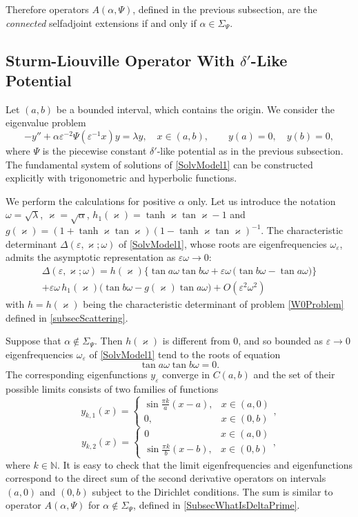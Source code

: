 \documentclass[11pt,english]{amsart}%
\DeclareMathOperator*{\tnh}{tanh} \DeclareMathOperator*{\tng}{tan}
\begin{document}
Therefore  operators $A(\alpha,\Psi)$, defined in the previous subsection, are  the \emph{connected} selfadjoint extensions if and only  if $\alpha\in \Sigma_\Psi$.


\subsection{Sturm-Liouville Operator With  $\delta'$-Like Potential}
Let $(a,b)$ be a bounded interval, which contains the origin. We consider the eigenvalue problem
\begin{equation}\label{SolvModel1}
    -y''+\alpha\varepsilon^{-2}\Psi(\varepsilon^{-1}x)y=\lambda y,\quad x\in(a,b),\qquad y(a)=0,\quad y(b)=0,
\end{equation}
where $\Psi$ is the piecewise constant $\delta'$-like potential as in the previous subsection.
The fundamental system of solutions of \eqref{SolvModel1}  can be constructed explicitly with trigonometric and  hyperbolic functions.

We  perform  the calculations for positive $\alpha$ only. Let us introduce the notation
$\omega=\sqrt{\lambda}$, $\varkappa=\sqrt{\alpha}$,
$h_1(\varkappa)=\tnh\varkappa\tng\varkappa-1$ and
$g(\varkappa)=(1+\tnh\varkappa\tng\varkappa)(1-\tnh\varkappa\tng\varkappa)^{-1}$.
The characteristic determinant $\Delta(\varepsilon, \varkappa;\omega)$ of \eqref{SolvModel1}, whose roots are eigenfrequencies $\omega_\varepsilon$, admits the asymptotic representation as $\varepsilon \omega\to 0$:
\begin{multline}\label{DetTeylor1}
\Delta(\varepsilon, \varkappa;\omega)= h(\varkappa)\bigl\{\tng a\omega \tng b\omega+\varepsilon\omega \,\bigl(\tng b\omega -\tng a\omega\bigr)\bigr\}\\
+\varepsilon\omega\, h_1(\varkappa)\bigl(\tng b\omega-g(\varkappa)\tng a\omega\bigr)
+O(\varepsilon^2\omega^2)
\end{multline}
with $h=h(\varkappa)$ being the characteristic determinant of problem \eqref{W0Problem}  defined in \ref{subsecScattering}.

Suppose that  $\alpha\not\in \Sigma_\Psi$. Then  $h(\varkappa)$ is different from $0$, and so
bounded as $\varepsilon\to 0$ eigenfrequencies $\omega_\varepsilon$ of \eqref{SolvModel1} tend to the roots of equation $$\tng a\omega\tng b\omega=0.$$ The corresponding eigenfunctions $y_\varepsilon$ converge in $C(a,b)$ and the set of their possible limits consists of two families of functions
$$
  y_{k,1}(x)=
    \begin{cases}
    \sin\frac{\pi k}{a}(x-a),& x\in(a,0)\\
    0,& x\in(0,b)
    \end{cases},
$$
$$
 y_{k,2}(x)=
    \begin{cases}
    0& x\in(a,0)\\
    \sin\frac{\pi k}{b}(x-b),& x\in (0,b)
    \end{cases},
$$
where $k\in \mathbb{N}$.
It is easy to check that the limit eigenfrequencies and eigenfunctions correspond to the direct sum of the second
derivative operators on intervals $(a,0)$ and $(0,b)$ subject to the Dirichlet conditions.
The sum is similar to operator
$A(\alpha,\Psi)$ for $\alpha\not\in \Sigma_\Psi$,  defined in \ref{SubsecWhatIsDeltaPrime}.
\end{document}
